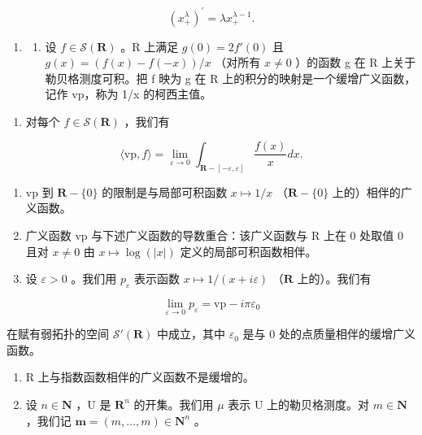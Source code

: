 \[
(x _ {+} ^ {\lambda}) ^ {\prime} = \lambda x _ {+} ^ {\lambda - 1}.
\]

\begin{enumerate}
\def\labelenumi{\arabic{enumi})}
\setcounter{enumi}{20}
\tightlist
\item
  \begin{enumerate}
  \def\labelenumii{\alph{enumii})}
  \tightlist
  \item
    设 \(f \in \mathcal{S}(\mathbf{R})\) 。R 上满足 \(g(0) = 2f'(0)\) 且 \(g(x) = (f(x) - f(-x))/x\) （对所有 \(x \neq 0\) ）的函数 g 在 R 上关于勒贝格测度可积。把 f 映为 g 在 R 上的积分的映射是一个缓增广义函数，记作 vp，称为 1/x 的柯西主值。
  \end{enumerate}
\end{enumerate}

\begin{enumerate}
\def\labelenumi{\alph{enumi})}
\setcounter{enumi}{1}
\tightlist
\item
  对每个 \(f \in \mathcal{S}(\mathbf{R})\) ，我们有
\end{enumerate}

\[
\langle \mathrm{vp}, f \rangle = \lim _ {\varepsilon \rightarrow 0} \int_ {\mathbf {R} - [ - \varepsilon , \varepsilon ]} \frac {f (x)}{x} d x.
\]

\begin{enumerate}
\def\labelenumi{\alph{enumi})}
\setcounter{enumi}{2}
\item
  vp 到 \(\mathbf{R} - \{0\}\) 的限制是与局部可积函数 \(x \mapsto 1/x\) （\(\mathbf{R} - \{0\}\) 上的）相伴的广义函数。
\item
  广义函数 vp 与下述广义函数的导数重合：该广义函数与 R 上在 0 处取值 0 且对 \(x \neq 0\) 由 \(x \mapsto \log(|x|)\) 定义的局部可积函数相伴。
\item
  设 \(\varepsilon > 0\) 。我们用 \(p_{\varepsilon}\) 表示函数 \(x \mapsto 1 / (x + i\varepsilon)\) （\(\mathbf{R}\) 上的）。我们有
\end{enumerate}

\[
\lim _ {\varepsilon \to 0} p _ {\varepsilon} = \mathrm{vp} - i \pi \varepsilon_ {0}
\]

在赋有弱拓扑的空间 \(\mathcal{S}'(\mathbf{R})\) 中成立，其中 \(\varepsilon_0\) 是与 0 处的点质量相伴的缓增广义函数。

\begin{enumerate}
\def\labelenumi{\arabic{enumi})}
\setcounter{enumi}{21}
\item
  R 上与指数函数相伴的广义函数不是缓增的。
\item
  设 \(n \in \mathbf{N}\) ，U 是 \(\mathbf{R}^n\) 的开集。我们用 \(\mu\) 表示 U 上的勒贝格测度。对 \(m \in \mathbf{N}\) ，我们记 \(\boldsymbol{m} = (m, \ldots, m) \in \mathbf{N}^n\) 。
\end{enumerate}

